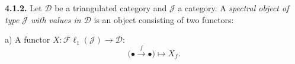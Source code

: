 \medskip\noindent\textbf{4.1.2.}\quad
Let $\mathcal D$ be a triangulated category and $\mathcal J$ a category.
A \emph{spectral object of type $\mathcal J$ with values in $\mathcal D$}
is an object consisting of two functors:

a) A functor
$X\colon\mathcal{F}\ell_1(\mathcal J)\longrightarrow\mathcal D$:
\[
\bigl(\mathord\bullet\xrightarrow f\mathord\bullet\bigr)\longmapsto X_f.
\]
\endgroup

